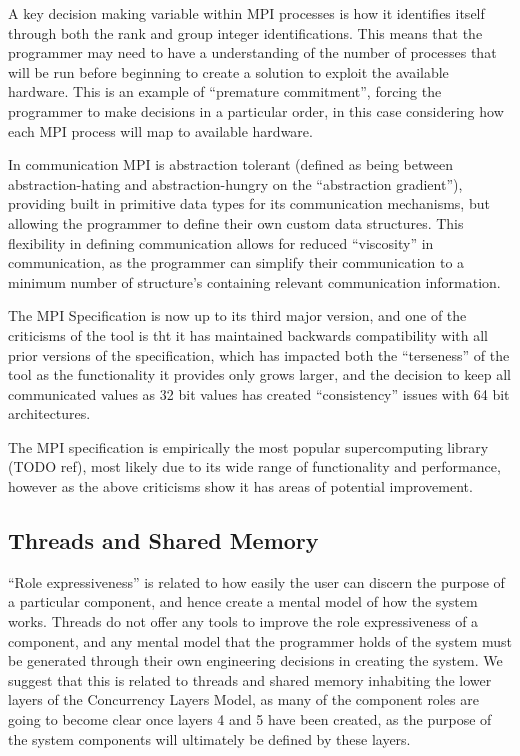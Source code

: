 \documentclass{sig-alternate}
\begin{document}
A key decision making variable within MPI processes is how it
identifies itself through both the rank and group integer
identifications. This means that the programmer may need to have a
understanding of the number of processes that will be run before
beginning to create a solution to exploit the available hardware. This
is an example of ``premature commitment'', forcing the programmer to
make decisions in a particular order, in this case considering how
each MPI process will map to available hardware.

In communication MPI is abstraction tolerant (defined as being between
abstraction-hating and abstraction-hungry on the ``abstraction
gradient''), providing built in primitive data types for its
communication mechanisms, but allowing the programmer to define their
own custom data structures. This flexibility in defining communication
allows for reduced ``viscosity'' in communication, as the programmer
can simplify their communication to a minimum number of structure's
containing relevant communication information.

The MPI Specification is now up to its third major version, and one of
the criticisms of the tool is tht it has maintained backwards
compatibility with all prior versions of the specification, which has
impacted both the ``terseness'' of the tool as the functionality it
provides only grows larger, and the decision to keep all communicated
values as 32 bit values has created ``consistency'' issues with 64 bit
architectures.

The MPI specification is empirically the most popular supercomputing
library (TODO ref), most likely due to its wide range of functionality and
performance, however as the above criticisms show it has areas of
potential improvement.

\subsection{Threads and Shared Memory}
``Role expressiveness'' is related to how easily the user can discern
the purpose of a particular component, and hence create a mental model
of how the system works. Threads do not offer any tools to improve the
role expressiveness of a component, and any mental model that the
programmer holds of the system must be generated through their own
engineering decisions in creating the system. We suggest that this is
related to threads and shared memory inhabiting the lower layers of
the Concurrency Layers Model, as many of the component roles are going
to become clear once layers 4 and 5 have been created, as the purpose
of the system components will ultimately be defined by these layers.
\end{document}
